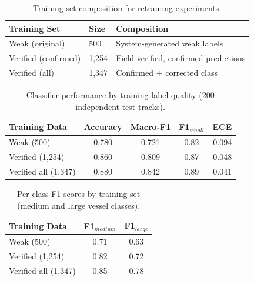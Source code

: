 \documentclass[conf]{asmeconf}
\begin{document}
\begin{table}[t]
\caption{Training set composition for retraining experiments.}
\label{tab:training_sets}
\centering
\small
\begin{tabular}{@{}llp{4cm}@{}}
\toprule
Training Set & Size & Composition \\
\midrule
Weak (original) & 500 & System-generated weak labels \\
\midrule
Verified (confirmed) & 1,254 & Field-verified, confirmed predictions \\
\midrule
Verified (all) & 1,347 & Confirmed + corrected class \\
\bottomrule
\end{tabular}
\end{table}

\begin{table}[t]
\caption{Classifier performance by training label quality (200 independent test tracks).}
\label{tab:downstream}
\centering
\small
\begin{tabular}{@{}lcccr@{}}
\toprule
Training Data & Accuracy & Macro-F1 & F1$_{small}$ & ECE \\
\midrule
Weak (500) & 0.780 & 0.721 & 0.82 & 0.094 \\
Verified (1,254) & 0.860 & 0.809 & 0.87 & 0.048 \\
Verified all (1,347) & 0.880 & 0.842 & 0.89 & 0.041 \\
\bottomrule
\end{tabular}
\end{table}

\begin{table}[t]
\caption{Per-class F1 scores by training set (medium and large vessel classes).}
\label{tab:downstream_perclass}
\centering
\small
\begin{tabular}{@{}lcc@{}}
\toprule
Training Data & F1$_{medium}$ & F1$_{large}$ \\
\midrule
Weak (500) & 0.71 & 0.63 \\
Verified (1,254) & 0.82 & 0.72 \\
Verified all (1,347) & 0.85 & 0.78 \\
\bottomrule
\end{tabular}
\end{table}
\end{document}
